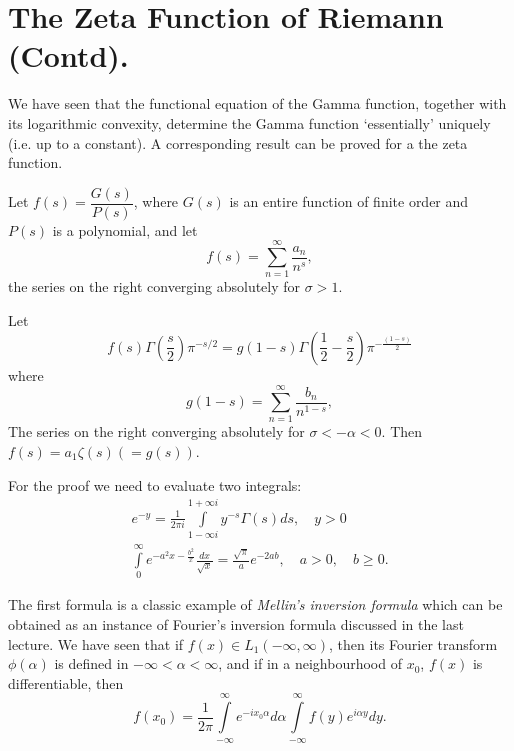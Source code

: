 
\chapter{The Zeta Function of Riemann (Contd).}\label{chap16}

\medskip
{}\cite{key13}\pageoriginale

We have seen that the functional equation of the Gamma function,
together with its logarithmic convexity, determine the Gamma function
`essentially' uniquely (i.e. up to a constant). A corresponding
result can be proved for a the zeta function.

\setcounter{thm}{0}
\begin{thm}\label{chap16:thm1}
Let $f(s) = \dfrac{G(s)}{P(s)}$, where $G(s)$ is an entire function of
finite order and $P(s)$ is a polynomial, and let
\begin{equation*}
f(s) = \sum\limits^\infty_{n=1} \frac{a_n}{n^s}, \tag{1.1}\label{c16:eq1.1}
\end{equation*}
the series on the right converging absolutely for $\sigma >1$.

Let 
\begin{equation*}
f(s) \Gamma \left(\frac{s}{2} \right) \pi^{-s/2} = g(1-s)
\Gamma \left(\frac{1}{2} -\frac{s}{2} \right) \pi^{-\frac{(1-s)}{2}} \tag{1.2}\label{c16:eq1.2}
 \end{equation*}
where 
\begin{equation*}
g(1-s) = \sum\limits^\infty_{n=1} \frac{b_n}{n^{1-s}}, \tag{1.3}\label{c16:eq1.3}
\end{equation*} 
The series on the right converging absolutely for $\sigma < - \alpha <
0$. Then $f(s) = a_1 \zeta(s) (=g(s))$.
\end{thm}

For the proof we need to evaluate two integrals:
\begin{gather*}
e^{-y} = \frac{1}{2\pi i} \int\limits^{1+\infty i}_{1-\infty i} y^{-s}
\Gamma(s) ds, \quad y > 0\tag{1}\label{c16:eq1}\\
\int\limits^{\infty}_0 e^{-a^2x -\frac{b^2}{x}}  \frac{dx}{\surd x} =
\frac{\surd \pi}{a} e^{-2ab}, \quad a>0, \quad b \geq 0. \tag{2}\label{c16:eq2}
\end{gather*}\pageoriginale

The first formula is a classic example of \textit{Mellin's inversion
  formula} which can be obtained as an instance of Fourier's inversion
formula discussed in the last lecture. We have seen that if $f(x)
\in L_1 (-\infty, \infty)$, then its Fourier transform $\phi(\alpha)$
is defined in $-\infty < \alpha < \infty$, and if in a neighbourhood
of $x_0$, $f(x)$ is differentiable, then
$$
f(x_0) = \frac{1}{2\pi} \int\limits^\infty_{-\infty} e^{-ix_0\alpha} d
\alpha \int\limits^\infty_{-\infty} f(y) e^{i\alpha y} dy.
$$

